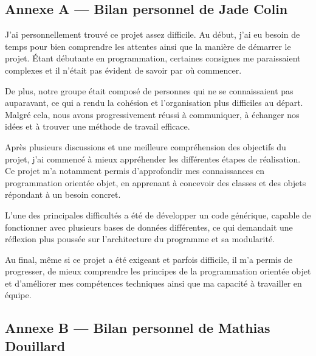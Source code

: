 \documentclass[12pt,a4paper]{article}
\begin{document}
\subsection*{Annexe A --- Bilan personnel de Jade Colin}

\begin{bilanbox}
J'ai personnellement trouvé ce projet assez difficile. Au début, j'ai eu besoin de temps
pour bien comprendre les attentes ainsi que la manière de démarrer le projet. Étant débutante
en programmation, certaines consignes me paraissaient complexes et il n'était pas évident de
savoir par où commencer.

\medskip
De plus, notre groupe était composé de personnes qui ne se connaissaient pas auparavant, ce
qui a rendu la cohésion et l'organisation plus difficiles au départ. Malgré cela, nous avons
progressivement réussi à communiquer, à échanger nos idées et à trouver une méthode de travail
efficace.

\medskip
Après plusieurs discussions et une meilleure compréhension des objectifs du projet, j'ai
commencé à mieux appréhender les différentes étapes de réalisation. Ce projet m'a notamment
permis d'approfondir mes connaissances en programmation orientée objet, en apprenant à
concevoir des classes et des objets répondant à un besoin concret.

\medskip
L'une des principales difficultés a été de développer un code générique, capable de fonctionner
avec plusieurs bases de données différentes, ce qui demandait une réflexion plus poussée sur
l'architecture du programme et sa modularité.

\medskip
Au final, même si ce projet a été exigeant et parfois difficile, il m'a permis de progresser,
de mieux comprendre les principes de la programmation orientée objet et d'améliorer mes
compétences techniques ainsi que ma capacité à travailler en équipe.
\end{bilanbox}

\subsection*{Annexe B --- Bilan personnel de Mathias Douillard}
\end{document}
